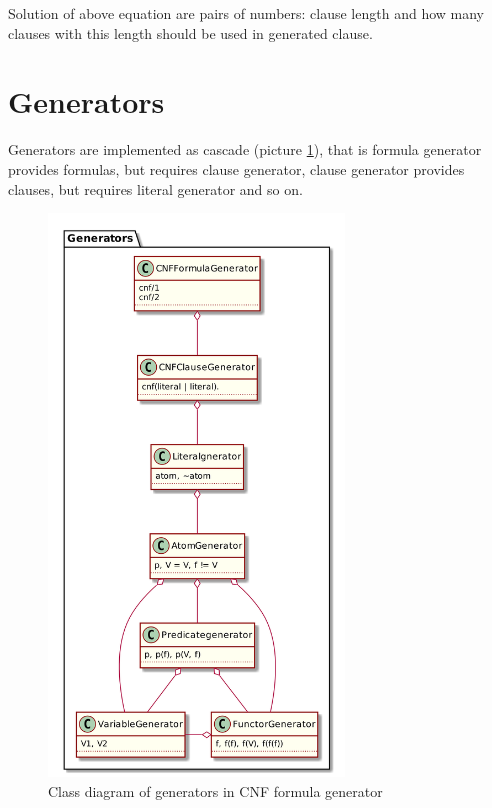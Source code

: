 Solution of above equation are pairs of numbers: clause length and how many clauses with this length should be used in generated clause.

\section{Generators}
\label{sec:Generators}

Generators are implemented as cascade (picture \ref{pic:fol_signature_generator_class_diagram}), that is formula generator provides formulas, but requires clause generator, clause generator provides clauses, but requires literal generator and so on.

\begin{figure}[h]
\begin{centering}
  \includegraphics[width=0.7\textwidth]{logic-formula-generator/fol/cnf_signature_generators.png}
  \caption{Class diagram of generators in CNF formula generator}
  \label{pic:fol_signature_generator_class_diagram}
\end{centering}
\end{figure}

